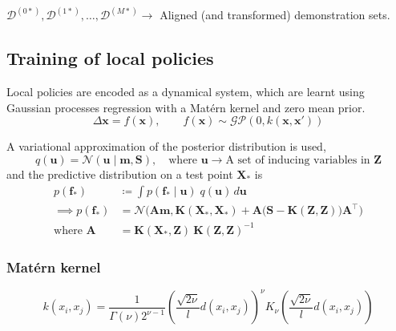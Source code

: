 \( \mathcal{D}^{(0*)}, \mathcal{D}^{(1*)}, \ldots, \mathcal{D}^{(M*)} \to \) Aligned (and transformed) demonstration sets.

\subsection{Training of local policies}

Local policies are encoded as a dynamical system, which are learnt using Gaussian processes regression with a Mat\'{e}rn kernel and zero mean prior.
\begin{equation}
    \Delta\boldsymbol{x} = f(\boldsymbol{x})
    , \qquad
    f(\boldsymbol{x}) \sim \mathcal{GP}(0, k(\boldsymbol{x}, \boldsymbol{x}'))
\end{equation}

A variational approximation of the posterior distribution is used,
\begin{equation}
    q(\boldsymbol{u}) = \mathcal{N}(\boldsymbol{u} \mid \boldsymbol{m}, \boldsymbol{S}), \quad \text{where } \boldsymbol{u} \to \text{A set of inducing variables in } \boldsymbol{Z}
\end{equation}
and the predictive distribution on a test point \( \boldsymbol{X}_* \) is
\begin{align}
    p(\boldsymbol{f}_*)
     & \coloneq
    \int p(\boldsymbol{f}_* \mid \boldsymbol{u}) \; q(\boldsymbol{u}) \, d\boldsymbol{u}
    \\
    \implies
    p(\boldsymbol{f}_*)
     & =
    \mathcal{N} \Big( \boldsymbol{A} \boldsymbol{m}, \boldsymbol{K}(\boldsymbol{X}_*, \boldsymbol{X}_*) + \boldsymbol{A} \big( \boldsymbol{S} - \boldsymbol{K}(\boldsymbol{Z}, \boldsymbol{Z}) \big) \boldsymbol{A}^\top \Big)
    \\
    \text{where }
    \boldsymbol{A}
     & =
    \boldsymbol{K}(\boldsymbol{X}_*, \boldsymbol{Z}) \ {\boldsymbol{K}(\boldsymbol{Z}, \boldsymbol{Z})}^{-1}
\end{align}

\subsubsection{Mat\'{e}rn kernel}

\begin{equation}
    k(x_i, x_j)
    =
    \frac{1}{\Gamma(\nu) 2^{\nu - 1}} {\left( \frac{\sqrt{2\nu}}{l} d(x_i , x_j) \right)}^\nu K_\nu \left( \frac{\sqrt{2\nu}}{l} d(x_i , x_j) \right)
\end{equation}

